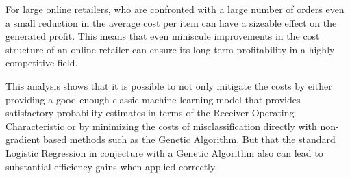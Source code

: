 For large online retailers, who are confronted with a large number of orders even a small reduction in the average cost per item can have a sizeable effect on the generated profit. This means that even miniscule improvements in the cost structure of an online retailer can ensure its long term profitability in a highly competitive field.

This analysis shows that it is possible to not only mitigate the costs by either providing a good enough classic machine learning model that provides satisfactory probability estimates in terms of the Receiver Operating Characteristic or by minimizing the costs of misclassification directly with non-gradient based methods such as the Genetic Algorithm. But that the standard Logistic Regression in conjecture with a Genetic Algorithm also can lead to substantial efficiency gains when applied correctly.
